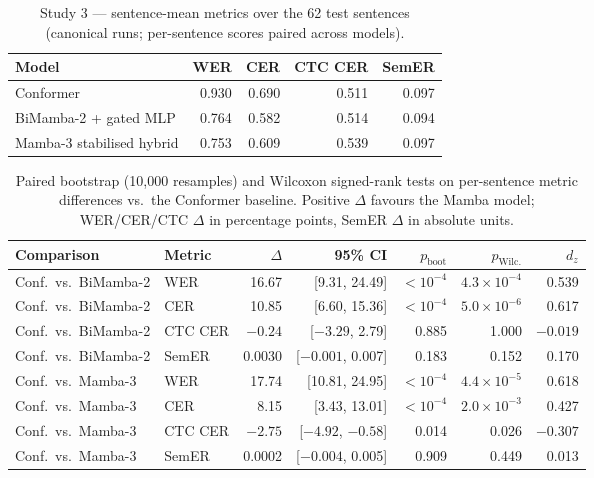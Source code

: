 \documentclass[11pt,a4paper]{report}
\begin{document}
\begin{table}[htbp]
\centering
\caption{Study 3 --- sentence-mean metrics over the 62 test sentences
(canonical runs; per-sentence scores paired across models).}
\label{tab:phase2stats}
\begin{tabular}{lrrrr}
\toprule
Model & WER & CER & CTC CER & SemER \\
\midrule
Conformer & 0.930 & 0.690 & 0.511 & 0.097 \\
BiMamba-2 + gated MLP & 0.764 & 0.582 & 0.514 & 0.094 \\
Mamba-3 stabilised hybrid & 0.753 & 0.609 & 0.539 & 0.097 \\
\bottomrule
\end{tabular}
\end{table}

\begin{table}[htbp]
\centering
\caption{Paired bootstrap (10{,}000 resamples) and Wilcoxon signed-rank
tests on per-sentence metric differences vs.\ the Conformer baseline.
Positive $\Delta$ favours the Mamba model; WER/CER/CTC $\Delta$ in
percentage points, SemER $\Delta$ in absolute units.}
\label{tab:bootstrap}
\small
\begin{tabular}{llrrrrr}
\toprule
Comparison & Metric & $\Delta$ & 95\% CI & $p_{\mathrm{boot}}$ & $p_{\mathrm{Wilc.}}$ & $d_z$ \\
\midrule
Conf.\ vs.\ BiMamba-2 & WER & 16.67 & [9.31, 24.49] & $<10^{-4}$ & $4.3{\times}10^{-4}$ & 0.539 \\
Conf.\ vs.\ BiMamba-2 & CER & 10.85 & [6.60, 15.36] & $<10^{-4}$ & $5.0{\times}10^{-6}$ & 0.617 \\
Conf.\ vs.\ BiMamba-2 & CTC CER & $-0.24$ & [$-3.29$, 2.79] & 0.885 & 1.000 & $-0.019$ \\
Conf.\ vs.\ BiMamba-2 & SemER & 0.0030 & [$-0.001$, 0.007] & 0.183 & 0.152 & 0.170 \\
\midrule
Conf.\ vs.\ Mamba-3 & WER & 17.74 & [10.81, 24.95] & $<10^{-4}$ & $4.4{\times}10^{-5}$ & 0.618 \\
Conf.\ vs.\ Mamba-3 & CER & 8.15 & [3.43, 13.01] & $<10^{-4}$ & $2.0{\times}10^{-3}$ & 0.427 \\
Conf.\ vs.\ Mamba-3 & CTC CER & $-2.75$ & [$-4.92$, $-0.58$] & 0.014 & 0.026 & $-0.307$ \\
Conf.\ vs.\ Mamba-3 & SemER & 0.0002 & [$-0.004$, 0.005] & 0.909 & 0.449 & 0.013 \\
\bottomrule
\end{tabular}
\end{table}
\end{document}
